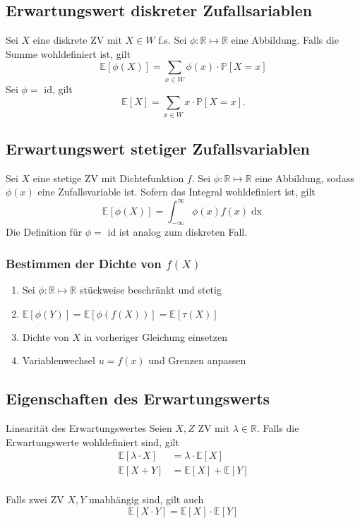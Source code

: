 \documentclass[a4paper,10pt]{article}
\def\R{\mathbb{R}}
\def\P{\mathbb{P}}
\def\E{\mathbb{E}}
\begin{document}
\subsection{Erwartungswert diskreter Zufallsariablen}

Sei \(X\) eine diskrete ZV mit \(X \in W\) f.s. Sei \(\phi: \R \mapsto \R\) eine Abbildung. Falls die Summe wohldefiniert ist, gilt
\[\E[\phi(X)] = \sum_{x\in W} \phi(x)\cdot \P[X=x]\]
Sei \(\phi = \) id, gilt
\[
	\E[X] = \sum_{x\in W} x \cdot \P[X=x]
	.\]


\subsection{Erwartungswert stetiger Zufallsvariablen}

Sei \(X\) eine stetige ZV mit Dichtefunktion \(f\). Sei \(\phi :\R\mapsto \R\) eine Abbildung, sodass \(\phi(x)\) eine Zufallsvariable ist. Sofern das Integral wohldefiniert ist, gilt
\[\E[\phi(X)] = \int_{-\infty}^{\infty}\phi(x)f(x) \mathop{dx}\]
Die Definition für \(\phi = \) id ist analog zum diskreten Fall.
\subsubsection{\texorpdfstring{Bestimmen der Dichte von \(f(X)\)}{Bestimmen der Dichte von f(X)}}
\begin{enumerate}
	\item Sei \(\phi: \R \mapsto \R\) stückweise beschränkt und stetig
	\item \(\E[\phi(Y)] = \E[\phi(f(X))] = \E[\tau(X)]\)
	\item Dichte von \(X\) in vorheriger Gleichung einsetzen
	\item Variablenwechsel \(u = f(x)\) und Grenzen anpassen
\end{enumerate}


\subsection{Eigenschaften des Erwartungswerts}

\begin{subbox}{Linearität des Erwartungswertes}
	Seien \(X,Z\) ZV mit \(\lambda \in \R\). Falls die Erwartungswerte wohldefiniert sind, gilt
	\begin{align*}
		\E[\lambda \cdot X] & = \lambda \cdot \E[X] \\
		\E[X + Y]           & = \E[X] + \E[Y]       \\
	\end{align*}
\end{subbox}
Falls zwei ZV \(X,Y\) unabhängig sind, gilt auch
\[\E[X\cdot Y] = \E[X] \cdot \E[Y]\]
\end{document}
